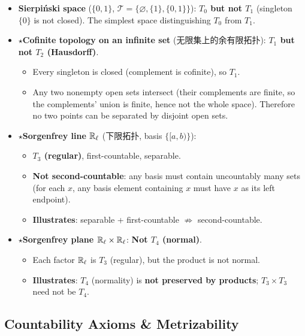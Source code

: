 \documentclass{article}
\newcommand{\starKey}{\textcolor{red!65!black}{\textbf{$\star$}}}
\begin{document}
\begin{itemize}
  \item \textbf{Sierpi\'nski space} ($\{0,1\}$, $\mathcal{T}=\{\varnothing,\{1\},\{0,1\}\}$):
  \textbf{$T_0$ but not $T_1$} (singleton $\{0\}$ is not closed).
  The simplest space distinguishing $T_0$ from $T_1$.

  \item \starKey \textbf{Cofinite topology on an infinite set} (无限集上的余有限拓扑):
  \textbf{$T_1$ but not $T_2$ (Hausdorff)}.
  \begin{itemize}
    \item Every singleton is closed (complement is cofinite), so $T_1$.
    \item Any two nonempty open sets intersect (their complements are finite,
    so the complements' union is finite, hence not the whole space).
    Therefore no two points can be separated by disjoint open sets.
  \end{itemize}

  \item \starKey \textbf{Sorgenfrey line $\mathbb{R}_\ell$} (下限拓扑, basis $\{[a,b)\}$):
  \begin{itemize}
    \item \textbf{$T_3$ (regular)}, first-countable, separable.
    \item \textbf{Not second-countable}: any basis must contain uncountably many sets
    (for each $x$, any basis element containing $x$ must have $x$ as its left endpoint).
    \item \textbf{Illustrates}: separable + first-countable $\nRightarrow$ second-countable.
  \end{itemize}

  \item \starKey \textbf{Sorgenfrey plane $\mathbb{R}_\ell\times\mathbb{R}_\ell$}:
  \textbf{Not $T_4$ (normal)}.
  \begin{itemize}
    \item Each factor $\mathbb{R}_\ell$ is $T_3$ (regular), but the product is not normal.
    \item \textbf{Illustrates}: $T_4$ (normality) is \textbf{not preserved by products};
    $T_3\times T_3$ need not be $T_4$.
  \end{itemize}
\end{itemize}

\subsection{Countability Axioms \& Metrizability}
\end{document}
